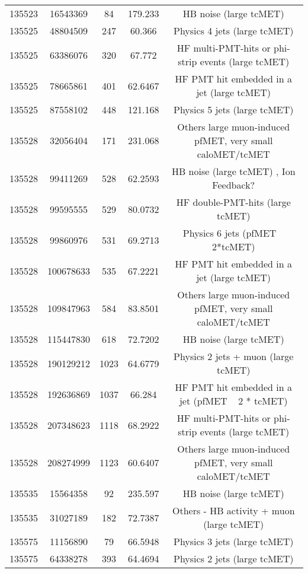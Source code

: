 \begin{table}[htbp]
\begin{center}
\begin{tabular}{|c|c|c|c|c|}
      135523 & 16543369    &  84   &    179.233  & HB noise (large tcMET) \\
      135525 & 48804509    &  247  &    60.366   & Physics 4 jets (large tcMET) \\
      135525 & 63386076    &  320  &    67.772   & HF multi-PMT-hits or phi-strip events (large tcMET) \\
      135525 & 78665861    &  401  &    62.6467  & HF PMT hit embedded in a jet (large tcMET) \\
      135525 & 87558102    &  448  &    121.168  & Physics 5 jets (large tcMET) \\
      135528 & 32056404    &  171  &    231.068  & Others large muon-induced pfMET, very small caloMET/tcMET \\
      135528 & 99411269    &  528  &    62.2593  & HB noise (large tcMET) , Ion Feedback? \\
      135528 & 99595555    &  529  &    80.0732  & HF double-PMT-hits (large tcMET) \\
      135528 & 99860976    &  531  &    69.2713  & Physics 6 jets (pfMET ~ 2*tcMET) \\
      135528 & 100678633   &  535  &    67.2221  & HF PMT hit embedded in a jet (large tcMET) \\
      135528 & 109847963   &  584  &    83.8501  & Others large muon-induced pfMET, very small caloMET/tcMET \\
      135528 & 115447830   &  618  &    72.7202  & HB noise (large tcMET) \\
      135528 & 190129212   &  1023 &    64.6779  & Physics 2 jets + muon (large tcMET) \\
      135528 & 192636869   &  1037 &    66.284   & HF PMT hit embedded in a jet (pfMET ~ 2 * tcMET) \\
      135528 & 207348623   &  1118 &    68.2922  & HF multi-PMT-hits or phi-strip events (large tcMET) \\
      135528 & 208274999   &  1123 &    60.6407  & Others large muon-induced pfMET, very small caloMET/tcMET \\
      135535 & 15564358    &  92   &    235.597  & HB noise (large tcMET) \\
      135535 & 31027189    &  182  &    72.7387  & Others - HB activity + muon (large tcMET) \\
      135575 & 11156890    &  79   &    66.5948  & Physics 3 jets (large tcMET) \\
      135575 & 64338278    &  393  &    64.4694  & Physics 2 jets (large tcMET) \\ 

\end{tabular}
\end{center}
\end{table}
